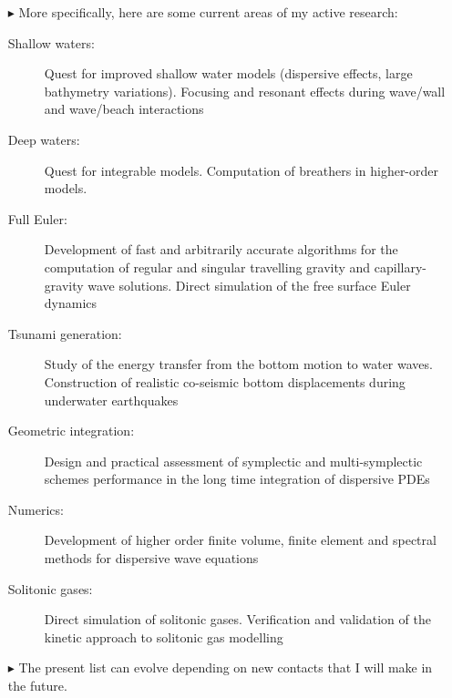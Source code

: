 \begin{itemize}
\begin{itemize}
	\end{itemize}
  \item[$\blacktriangleright$] More specifically, here are some current areas of my active research:
  \begin{description}
    \item[Shallow waters:] Quest for improved shallow water models (dispersive effects, large bathymetry variations). Focusing and resonant effects during wave/wall and wave/beach interactions
    \item[Deep waters:] Quest for integrable models. Computation of breathers in higher-order models.
    \item[Full Euler:] Development of fast and arbitrarily accurate algorithms for the computation of regular and singular travelling gravity and capillary-gravity wave solutions. Direct simulation of the free surface Euler dynamics
    \item[Tsunami generation:] Study of the energy transfer from the bottom motion to water waves. Construction of realistic co-seismic bottom displacements during underwater earthquakes
    \item[Geometric integration:] Design and practical assessment of symplectic and multi-symplectic schemes performance in the long time integration of dispersive PDEs
    \item[Numerics:] Development of higher order finite volume, finite element and spectral methods for dispersive wave equations
    \item[Solitonic gases:] Direct simulation of solitonic gases. Verification and validation of the kinetic approach to solitonic gas modelling
  \end{description}
  \item[$\blacktriangleright$] The present list can evolve depending on new contacts that I will make in the future.
\end{itemize}